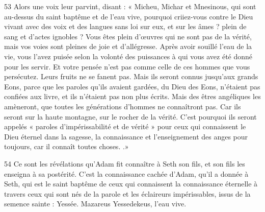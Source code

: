 \par 53 Alors une voix leur parvint, disant : « Micheu, Michar et Mnesinous, qui sont au-dessus du saint baptême et de l'eau vive, pourquoi criiez-vous contre le Dieu vivant avec des voix et des langues sans loi sur eux, et sur les âmes ? plein de sang et d'actes ignobles ? Vous êtes plein d'œuvres qui ne sont pas de la vérité, mais vos voies sont pleines de joie et d'allégresse. Après avoir souillé l'eau de la vie, vous l'avez puisée selon la volonté des puissances à qui vous avez été donné pour les servir. Et votre pensée n'est pas comme celle de ces hommes que vous persécutez. Leurs fruits ne se fanent pas. Mais ils seront connus jusqu'aux grands Eons, parce que les paroles qu'ils avaient gardées, du Dieu des Eons, n'étaient pas confiées aux livre, et ils n’étaient pas non plus écrits. Mais des êtres angéliques les amèneront, que toutes les générations d’hommes ne connaîtront pas. Car ils seront sur la haute montagne, sur le rocher de la vérité. C'est pourquoi ils seront appelés « paroles d'impérissabilité et de vérité » pour ceux qui connaissent le Dieu éternel dans la sagesse, la connaissance et l'enseignement des anges pour toujours, car il connaît toutes choses. .»

\par 54 Ce sont les révélations qu'Adam fit connaître à Seth son fils, et son fils les enseigna à sa postérité. C'est la connaissance cachée d'Adam, qu'il a donnée à Seth, qui est le saint baptême de ceux qui connaissent la connaissance éternelle à travers ceux qui sont nés de la parole et les éclaireurs impérissables, issus de la semence sainte : Yessée. Mazareus Yessedekeus, l'eau vive.


